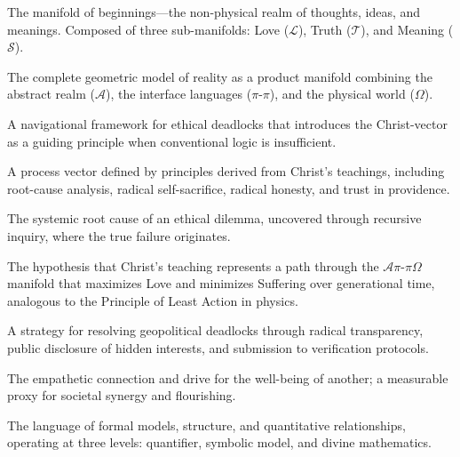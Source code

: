 \documentclass[11pt,a4paper]{article}
\begin{document}
\begin{description}[style=nextline, leftmargin=0pt, labelindent=0pt, font=\normalfont\bfseries]
    \item[$\mathcal{A}$ (Alpha Manifold)] The manifold of beginnings—the non-physical realm of thoughts, ideas, and meanings. Composed of three sub-manifolds: Love ($\mathcal{L}$), Truth ($\mathcal{T}$), and Meaning ($\mathcal{S}$).
    
    \item[$\mathcal{A}\pi\text{-}\pi\Omega$ Manifold] The complete geometric model of reality as a product manifold combining the abstract realm ($\mathcal{A}$), the interface languages ($\pi\text{-}\pi$), and the physical world ($\Omega$).
    
    \item[Beacon Protocol] A navigational framework for ethical deadlocks that introduces the Christ-vector as a guiding principle when conventional logic is insufficient.
    
    \item[Christ-Vector] A process vector defined by principles derived from Christ's teachings, including root-cause analysis, radical self-sacrifice, radical honesty, and trust in providence.
    
    \item[Ethical Singularity] The systemic root cause of an ethical dilemma, uncovered through recursive inquiry, where the true failure originates.
    
    \item[Geodesic Ethics] The hypothesis that Christ's teaching represents a path through the $\mathcal{A}\pi\text{-}\pi\Omega$ manifold that maximizes Love and minimizes Suffering over generational time, analogous to the Principle of Least Action in physics.
    
    \item[Geopolitical Maieutics] A strategy for resolving geopolitical deadlocks through radical transparency, public disclosure of hidden interests, and submission to verification protocols.
    
    \item[Love (Operational Definition)] The empathetic connection and drive for the well-being of another; a measurable proxy for societal synergy and flourishing.
    
    \item[The Number] The language of formal models, structure, and quantitative relationships, operating at three levels: quantifier, symbolic model, and divine mathematics.
    

\end{description}
\end{document}
